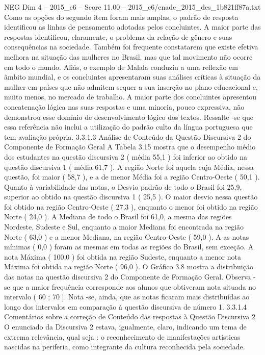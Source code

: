 \begin{textsample}{NEG Dim 4 – 2015\_c6 – Score 11.00 – 2015\_c6/enade\_2015\_des\_1b821ff87a.txt}
Como as opções do segundo item foram mais amplas, o padrão de resposta identificou as linhas de pensamento adotadas pelos concluintes.
A maior parte das respostas identificou, claramente, o problema da relação de gênero e suas consequências na sociedade.
Também foi frequente constatarem que existe efetiva melhora na situação das mulheres no Brasil, mas que tal movimento não ocorre em todo o mundo.
Aliás, o exemplo de Malala conduziu a uma reflexão em âmbito mundial, e os concluintes apresentaram suas análises críticas à situação da mulher em países que não admitem sequer a sua inserção no plano educacional e, muito menos, no mercado de trabalho.
A maior parte dos concluintes apresentou concatenação lógica nas suas respostas e uma minoria, pouco expressiva, não demonstrou esse domínio de desenvolvimento lógico dos textos.
Ressalte -se que essa referência não inclui a utilização do padrão culto da língua portuguesa que tem avaliação própria. 3.3.1.3 Análise de Conteúdo da Questão Discursiva 2 do Componente de Formação Geral A Tabela 3.15 mostra que o desempenho médio dos estudantes na questão discursiva 2 ( média 55,1 ) foi inferior ao obtido na questão discursiva 1 ( média 61,7 ).
A região Norte foi aquela cuja Média, nessa questão, foi maior ( 58,7 ), e a de menor Média foi a região Centro-Oeste ( 50,1 ).
Quanto à variabilidade das notas, o Desvio padrão de todo o Brasil foi 25,9, superior ao obtido na questão discursiva 1 ( 25,5 ).
O maior desvio nessa questão foi obtido na região Centro-Oeste ( 27,3 ), enquanto o menor foi obtido na região Norte ( 24,0 ).
A Mediana de todo o Brasil foi 61,0, a mesma das regiões Nordeste, Sudeste e Sul, enquanto a maior Mediana foi encontrada na região Norte ( 63,0 ) e a menor Mediana, na região Centro-Oeste ( 59,0 ).
A as notas mínimas ( 0,0 ) foram as mesmas em todas as regiões do Brasil, sem exceção.
A nota Máxima ( 100,0 ) foi obtida na região Sudeste, enquanto a menor nota Máxima foi obtida na região Norte ( 96,0 ).
O Gráfico 3.8 mostra a distribuição das notas na questão discursiva 2 do Componente de Formação Geral.
Observa -se que a maior frequência corresponde aos alunos que obtiveram nota situada no intervalo ( 60 ; 70 ].
Nota -se, ainda, que as notas ficaram mais distribuídas ao longo dos intervalos em comparação à questão discursiva de número 1. 3.3.1.4 Comentários sobre a correção de Conteúdo das respostas à Questão Discursiva 2 O enunciado da Discursiva 2 estava, igualmente, claro, indicando um tema de extrema relevância, qual seja : o reconhecimento de manifestações artísticas nascidas na periferia, como integrante da cultura reconhecida pela sociedade.

\end{textsample}
